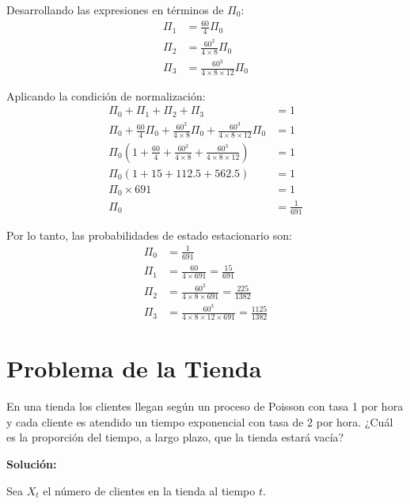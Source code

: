 \documentclass{article}
\begin{document}
Desarrollando las expresiones en términos de $\Pi_0$:
\begin{align*}
\Pi_1 &= \frac{60}{4} \Pi_0 \\
\Pi_2 &= \frac{60^2}{4 \times 8} \Pi_0 \\
\Pi_3 &= \frac{60^3}{4 \times 8 \times 12} \Pi_0
\end{align*}

Aplicando la condición de normalización:
\begin{align*}
\Pi_0 + \Pi_1 + \Pi_2 + \Pi_3 &= 1 \\
\Pi_0 + \frac{60}{4}\Pi_0 + \frac{60^2}{4 \times 8}\Pi_0 + \frac{60^3}{4 \times 8 \times 12}\Pi_0 &= 1 \\
\Pi_0 \left(1 + \frac{60}{4} + \frac{60^2}{4 \times 8} + \frac{60^3}{4 \times 8 \times 12}\right) &= 1 \\
\Pi_0 (1 + 15 + 112.5 + 562.5) &= 1 \\
\Pi_0 \times 691 &= 1 \\
\Pi_0 &= \frac{1}{691}
\end{align*}

Por lo tanto, las probabilidades de estado estacionario son:
\begin{align*}
\Pi_0 &= \frac{1}{691} \\
\Pi_1 &= \frac{60}{4 \times 691} = \frac{15}{691} \\
\Pi_2 &= \frac{60^2}{4 \times 8 \times 691} = \frac{225}{1382} \\
\Pi_3 &= \frac{60^3}{4 \times 8 \times 12 \times 691} = \frac{1125}{1382}
\end{align*}

\section{Problema de la Tienda}

En una tienda los clientes llegan según un proceso de Poisson con tasa 1 por hora y cada cliente es atendido un tiempo exponencial con tasa de 2 por hora. ¿Cuál es la proporción del tiempo, a largo plazo, que la tienda estará vacía?

\textbf{Solución:}

Sea $X_t$ el número de clientes en la tienda al tiempo $t$.

\begin{center}
\end{center}
\end{document}
